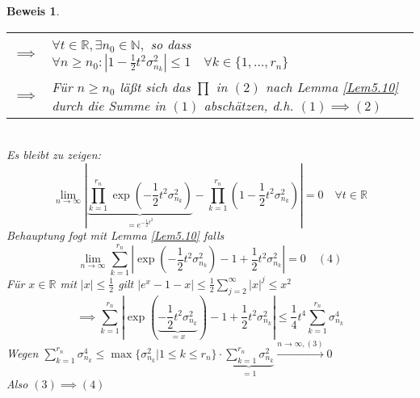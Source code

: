 \documentclass[a4paper,11pt]{scrbook}
\newcommand{\R}{{\mathbb R}}
\newcommand{\N}{{\mathbb N}}
\def\folgt{\ensuremath{\implies}}
\theoremstyle{nonumberplain}
\newtheorem{Bew}{Beweis}
\begin{document}
\begin{Bew}
\begin{tabular}[b]{rp{}}
$\folgt$ & $\forall t\in\R, \exists n_0\in\N,$ so dass $\forall n\ge n_0: |1-\frac 1 2 t^2\sigma_{n_k}^2|\le 1\quad \forall k\in\{1,\ldots, r_n\}$\\
$\folgt$ & Für $n\ge n_0$ läßt sich das $\prod$ in $(2)$ nach Lemma \ref{Lem5.10} durch die Summe in $(1)$ abschätzen, d.h. $(1)\folgt(2)$\\
\end{tabular}\\
Es bleibt zu zeigen:
$$\lim_{n\to\infty}|\underbrace{\prod_{k=1}^{r_n}\exp(-\frac 1 2 t^2\sigma_{n_k}^2)}_{=e^{-\frac 1 2 t^2}} - \prod_{k=1}^{r_n}(1-\frac 1 2 t^2 \sigma_{n_k}^2)| = 0 \quad\forall t\in\R$$
Behauptung fogt mit Lemma \ref{Lem5.10} falls
$$\lim_{n\to\infty}\sum_{k=1}^{r_n}\left|\exp(-\frac 1 2 t^2\sigma_{n_k}^2) - 1 + \frac 1 2 t^2\sigma_{n_k}^2\right| = 0\quad (4)$$
Für $x\in\R$ mit $|x|\le\frac 1 2$ gilt $|e^x-1-x|\le\frac 1 2 \sum_{j=2}^\infty |x|^j\le x^2$
$$\folgt \sum_{k=1}^{r_n}|\exp(\underbrace{-\frac 1 2 t^2\sigma_{n_k}^2}_{=x}) - 1 + \frac 1 2 t^2\sigma_{n_k}^2|\le \frac 1 4 t^4\sum_{k=1}^{r_n}\sigma_{n_k}^4$$
Wegen $\sum_{k=1}^{r_n}\sigma_{n_k}^4\le\max\{\sigma_{n_k}^2|1\le k\le r_n\} \cdot\underbrace{\sum_{k=1}^{r_n}\sigma_{n_k}^2}_{=1}\stackrel{n\to\infty, (3)}{\to}0$\\
Also $(3)\folgt(4)$
\end{Bew}
\end{document}
